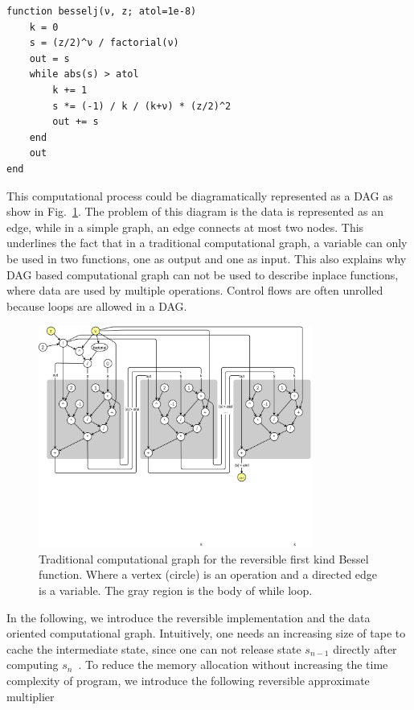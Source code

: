 \documentclass[aps,twocolumn,longbibliography,english,superscriptaddress]{revtex4-1}
\newcommand{\<}{\langle}
\renewcommand{\>}{\rangle}
\newcommand{\Fig}[1]{Fig.~\ref{#1}}
\theoremstyle{definition}\newtheorem{definition}{\textit{Definition}}
\begin{document}
\begin{minipage}{.44\textwidth}
\begin{lstlisting}
function besselj(ν, z; atol=1e-8)
    k = 0
    s = (z/2)^ν / factorial(ν)
    out = s
    while abs(s) > atol
        k += 1
        s *= (-1) / k / (k+ν) * (z/2)^2
        out += s
    end
    out
end
\end{lstlisting}
\end{minipage}

This computational process could be diagramatically represented as a DAG as show in \Fig{fig:computational-graph}.
The problem of this diagram is the data is represented as an edge, while in a simple graph, an edge connects at most two nodes. This underlines the fact that in a traditional computational graph, a variable can only be used in two functions, one as output and one as input. This also explains why DAG based computational graph can not be used to describe inplace functions, where data are used by multiple operations.
Control flows are often unrolled because loops are allowed in a DAG.
\begin{figure}
    \centerline{\includegraphics[width=0.8\textwidth,trim={0cm 6cm 0 0},clip]{images/computational_graph.pdf}}
    \caption{Traditional computational graph for the reversible first kind Bessel function. Where a vertex (circle) is an operation and a directed edge is a variable. The gray region is the body of while loop.}\label{fig:computational-graph}
\end{figure}

In the following, we introduce the reversible implementation and the data oriented computational graph.
Intuitively, one needs an increasing size of tape to cache the intermediate state, since one can not release state $s_{n-1}$ directly after computing $s_n$~\cite{Perumalla2013}.
To reduce the memory allocation without increasing the time complexity of program, we introduce the following reversible approximate multiplier
\end{document}
